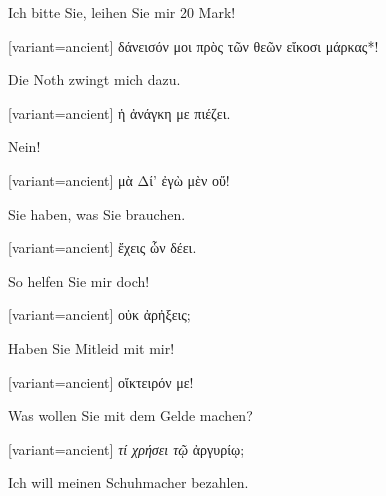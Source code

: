 Ich bitte Sie, leihen Sie mir 20 Mark! 

\switchcolumn

\begin{greek}[variant=ancient]%
δάνεισόν μοι πρὸς τῶν θεῶν εἴκοσι μάρκας{*}!

\end{greek}%
\switchcolumn*

Die Noth zwingt mich dazu. 

\switchcolumn

\begin{greek}[variant=ancient]%
ἡ ἀνάγκη με πιέζει.

\end{greek}%
\switchcolumn*

Nein! 

\switchcolumn

\begin{greek}[variant=ancient]%
μὰ Δί' ἐγὼ μὲν οὔ!

\end{greek}%
\switchcolumn*

Sie haben, was Sie brauchen. 

\switchcolumn

\begin{greek}[variant=ancient]%
ἔχεις ὧν δέει.

\end{greek}%
\switchcolumn*

So helfen Sie mir doch! 

\switchcolumn

\begin{greek}[variant=ancient]%
οὐκ ἀρἠξεις;

\end{greek}%
\switchcolumn*

Haben Sie Mitleid mit mir! 

\switchcolumn

\begin{greek}[variant=ancient]%
οἴκτειρόν με!

\end{greek}%
\switchcolumn*

Was wollen Sie mit dem Gelde machen? 

\switchcolumn

\begin{greek}[variant=ancient]%
\emph{τί χρήσει τῷ} ἀργυρίῳ;

\end{greek}%
\switchcolumn*

Ich will meinen Schuhmacher bezahlen. 


